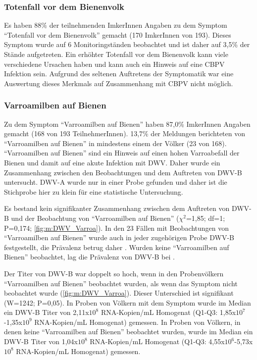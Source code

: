 \subsubsection{Totenfall vor dem Bienenvolk}

Es haben 88\% der teilnehmenden ImkerInnen Angaben zu dem Symptom \enquote{Totenfall vor dem Bienenvolk} gemacht (170 ImkerInnen von 193). Dieses Symptom wurde auf 6 Monitoringständen beobachtet und ist daher auf 3,5\% der Stände aufgetreten. Ein erhöhter Totenfall vor dem Bienenvolk kann viele verschiedene Ursachen haben und kann auch ein Hinweis auf eine CBPV Infektion sein. Aufgrund des seltenen Auftretens der Symptomatik war eine Auswertung dieses Merkmals auf Zusammenhang mit CBPV nicht möglich.

\subsubsection{Varroamilben auf Bienen}

Zu dem Symptom \enquote{Varroamilben auf Bienen} haben 87,0\% ImkerInnen Angaben gemacht (168 von 193 TeilnehmerInnen). 13,7\% der Meldungen berichteten von \enquote{Varroamilben auf Bienen} in mindestens einem der Völker (23 von 168). \enquote{Varroamilben auf Bienen} sind ein Hinweis auf einen hohen Varroabefall der Bienen und damit auf eine akute Infektion mit DWV. Daher wurde ein Zusammenhang zwischen den Beobachtungen und dem Auftreten von DWV-B untersucht. DWV-A wurde nur in einer Probe gefunden und daher ist die Stichprobe hier zu klein für eine statistische Untersuchung.

Es bestand kein signifikanter Zusammenhang zwischen dem Auftreten von DWV-B und der Beobachtung von \enquote{Varroamilben auf Bienen} ($\chi^2$=1,85; df=1; P=0,174; \cref{fig:m:DWV_Varroa}). In den 23 Fällen mit Beobachtungen von \enquote{Varroamilben auf Bienen} wurde auch in jeder zugehörigen Probe DWV-B festgestellt, die Prävalenz betrug daher . Wurden keine \enquote{Varroamilben auf Bienen} beobachtet, lag die Prävalenz von DWV-B bei .

Der Titer von DWV-B war doppelt so hoch, wenn in den Probenvölkern \enquote{Varroamilben auf Bienen} beobachtet wurden, als wenn das Symptom nicht beobachtet wurde (\cref{fig:m:DWV_Varroa}). Dieser Unterschied ist signifikant (W=1242; P=0,05). In Proben von Völkern mit dem Symptom wurde im Median ein DWV-B Titer von 2,11x$10^8$ RNA-Kopien/\si{\milli\liter} Homogenat (Q1-Q3: 1,85x$10^7$-1,35x$10^9$ RNA-Kopien/\si{\milli\liter} Homogenat) gemessen. In Proben von Völkern, in denen keine \enquote{Varroamilben auf Bienen} beobachtet wurden, wurde im Median ein DWV-B Titer von 1,04x$10^8$ RNA-Kopien/\si{\milli\liter} Homogenat (Q1-Q3: 4,55x$10^6$-5,73x$10^8$ RNA-Kopien/\si{\milli\liter} Homogenat) gemessen.


